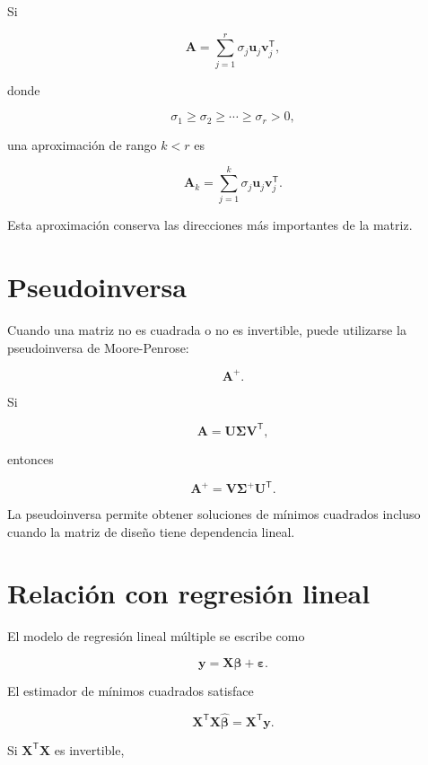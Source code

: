 \documentclass[
  spanish,
  10.5pt,
  letterpaper,
  DIV=11,
  numbers=noendperiod,
  oneside,
  open=any]{scrreprt}
\theoremstyle{definition}
\theoremstyle{definition}
\theoremstyle{plain}
\theoremstyle{remark}
\begin{document}
Si

\[
\mathbf{A}
=
\sum_{j=1}^{r}
\sigma_j
\mathbf{u}_j
\mathbf{v}_j^{\mathsf T},
\]

donde

\[
\sigma_1\geq\sigma_2\geq\cdots\geq\sigma_r>0,
\]

una aproximación de rango \(k<r\) es

\[
\mathbf{A}_k
=
\sum_{j=1}^{k}
\sigma_j
\mathbf{u}_j
\mathbf{v}_j^{\mathsf T}.
\]

Esta aproximación conserva las direcciones más importantes de la matriz.

\section*{Pseudoinversa}\label{pseudoinversa}


Cuando una matriz no es cuadrada o no es invertible, puede utilizarse la
pseudoinversa de Moore-Penrose:

\[
\mathbf{A}^{+}.
\]

Si

\[
\mathbf{A}
=
\mathbf{U}
\boldsymbol{\Sigma}
\mathbf{V}^{\mathsf T},
\]

entonces

\[
\mathbf{A}^{+}
=
\mathbf{V}
\boldsymbol{\Sigma}^{+}
\mathbf{U}^{\mathsf T}.
\]

La pseudoinversa permite obtener soluciones de mínimos cuadrados incluso
cuando la matriz de diseño tiene dependencia lineal.

\section*{Relación con regresión
lineal}\label{relaciuxf3n-con-regresiuxf3n-lineal}


El modelo de regresión lineal múltiple se escribe como

\[
\mathbf{y}
=
\mathbf{X}\boldsymbol{\beta}
+
\boldsymbol{\varepsilon}.
\]

El estimador de mínimos cuadrados satisface

\[
\mathbf{X}^{\mathsf T}
\mathbf{X}
\widehat{\boldsymbol{\beta}}
=
\mathbf{X}^{\mathsf T}\mathbf{y}.
\]

Si \(\mathbf{X}^{\mathsf T}\mathbf{X}\) es invertible,
\end{document}

